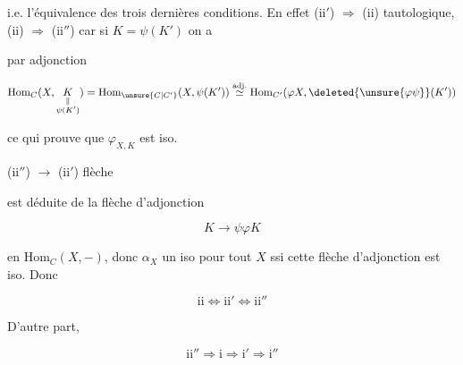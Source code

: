 i.e. l'équivalence des trois dernières conditions. En effet (ii$'$) $\Longrightarrow$ (ii) tautologique, (ii) $\Longrightarrow$ (ii$''$) car si $K=\psi(K')$ on a


par adjonction

\[
 \mathrm{Hom}_C(X,\underset{\substack{\Vert\\\psi(K')}}{K})
 =\mathrm{Hom}_{\unsure{C|C'}}(X,\psi(K'))
 \overset{\mathrm{adj.}}{\simeq}\mathrm{Hom}_{C'}(\varphi X,\deleted{\unsure{\varphi\psi}}(K'))
\]

 



ce qui prouve que $\varphi_{X,K}$ est iso.

(ii$''$) $\longrightarrow$ (ii$'$)   flèche


est déduite de la flèche d'adjonction

\[
 K\longrightarrow\psi\varphi K
\]

en  $\mathrm{Hom}_C(X,-)$, donc $\alpha_X$ un iso pour tout $X$ ssi cette flèche d'adjonction est iso. Donc

\[
 \mathrm{ii}\Longleftrightarrow\mathrm{ii}'\Longleftrightarrow\mathrm{ii}''
\]

D'autre part,

\[
 \mathrm{ii}''\Longrightarrow\mathrm{i}\Longrightarrow\mathrm{i}'\Longrightarrow\mathrm{i}''
\]

